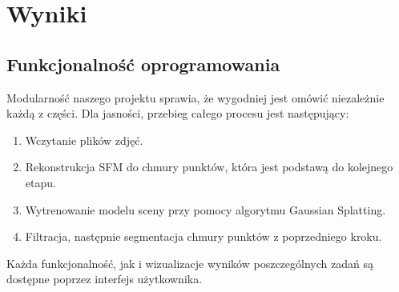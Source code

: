 \section{Wyniki}

\subsection{Funkcjonalność oprogramowania}

Modularność naszego projektu sprawia, że wygodniej jest omówić niezależnie każdą z części. Dla jasności, przebieg całego procesu jest następujący:
\begin{enumerate}
    \item Wczytanie plików zdjęć.
    \item Rekonstrukcja SFM do chmury punktów, która jest podstawą do kolejnego etapu.
    \item Wytrenowanie modelu sceny przy pomocy algorytmu Gaussian Splatting.
    \item Filtracja, następnie segmentacja chmury punktów z poprzedniego kroku.
\end{enumerate}
Każda funkcjonalność, jak i wizualizacje wyników poszczególnych zadań są dostępne poprzez interfejs użytkownika. 









